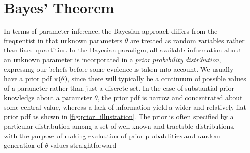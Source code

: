 \section{Bayes' Theorem}\label{sec:bayes_paradigm}

In terms of parameter inference, the Bayesian approach differs from the frequentist in that unknown parameters $\theta$ are treated as random variables rather than fixed quantities. In the Bayesian paradigm, all available information about an unknown parameter is incorporated in a \textit{prior probability distribution}, expressing our beliefs before some evidence is taken into account. We usually have a prior pdf $\pi \qty(\theta)$, since there will typically be a continuum of possible values of a parameter rather than just a discrete set. In the case of substantial prior knowledge about a parameter $\theta$, the prior pdf is narrow and concentrated about some central value, whereas a lack of information yield a wider and relatively flat prior pdf as shown in \autoref{fig:prior_illustration}. The prior is often specified by a particular distribution among a set of well-known and tractable distributions, with the purpose of making evaluation of prior probabilities and random generation of $\theta$ values straightforward.



